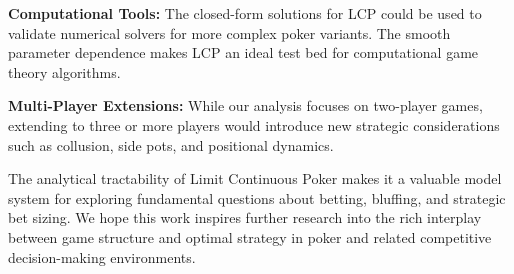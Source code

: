 \documentclass[../../main/main.tex]{subfiles}
\begin{document}
\textbf{Computational Tools:} The closed-form solutions for LCP could be used to validate numerical solvers for more complex poker variants. The smooth parameter dependence makes LCP an ideal test bed for computational game theory algorithms.

\textbf{Multi-Player Extensions:} While our analysis focuses on two-player games, extending to three or more players would introduce new strategic considerations such as collusion, side pots, and positional dynamics.

The analytical tractability of Limit Continuous Poker makes it a valuable model system for exploring fundamental questions about betting, bluffing, and strategic bet sizing. We hope this work inspires further research into the rich interplay between game structure and optimal strategy in poker and related competitive decision-making environments.
\end{document}
